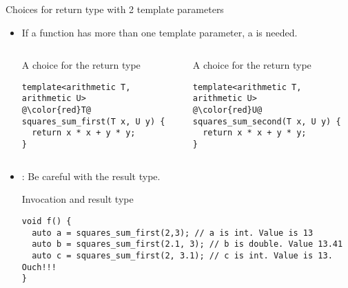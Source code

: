 \begin{frame}[t,fragile]{Choices for return type with 2 template parameters}

\begin{itemize}
  \item If a function has more than one template parameter, a  is needed.

\begin{columns}[T]
\begin{block}{A choice for the return type}
\begin{lstlisting}[escapechar=@]
template<arithmetic T, arithmetic U>
@\color{red}T@ squares_sum_first(T x, U y) {
  return x * x + y * y;
}
\end{lstlisting}
\end{block}

\begin{block}{A choice for the return type}
\begin{lstlisting}[escapechar=@]
template<arithmetic T, arithmetic U>
@\color{red}U@ squares_sum_second(T x, U y) {
  return x * x + y * y;
}
\end{lstlisting}
\end{block}
\end{columns}

  \item {}: Be careful with the result type.

\begin{block}{Invocation and result type}
\begin{lstlisting}
void f() {
  auto a = squares_sum_first(2,3); // a is int. Value is 13
  auto b = squares_sum_first(2.1, 3); // b is double. Value 13.41
  auto c = squares_sum_first(2, 3.1); // c is int. Value is 13. Ouch!!!
}
\end{lstlisting}
\end{block}

\end{itemize}
\end{frame}

